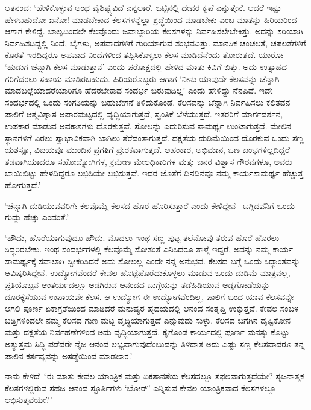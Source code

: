 ಆತನಂದ: ‘ಹೇಳಿಕೊಳ್ಳುವ ಅಂಥ ವೈಶಿಷ್ಟ್ಯವಿದೆ ಎನ್ನಲಾರೆ. ಒಟ್ಟಿನಲ್ಲಿ ದೇವರ ಕೃಪೆ ಎನ್ನುತ್ತೇನೆ. ಆದರೆ ಇಷ್ಟು ಹೇಳಬಹುದೋ ಏನೋ! ಮಾಡಬೇಕಾದ ಕೆಲಸಗಳನ್ನೆಲ್ಲಾ ಶ್ರದ್ಧೆಯಿಂದ ಮಾಡಬೇಕು ಎಂಬ ಮಾತನ್ನು ಹಿರಿಯರಿಂದ ಆಗಾಗ ಕೇಳಿದ್ದೆ. ಬಾಲ್ಯದಿಂದಲೇ ಕೆಲವೊಂದು ಜವಾಬ್ದಾರಿಯ ಕೆಲಸಗಳನ್ನು ನಿರ್ವಹಿಸಲೇಬೇಕಿತ್ತು. ಅದನ್ನು ಸರಿಯಾಗಿ ನಿರ್ವಹಿಸದಿದ್ದಲ್ಲಿ ನಿಂದೆ, ಬೈಗಳು, ಅಪವಾದಗಳಿಗೆ ಗುರಿಯಾಗುವ ಸಂಭವವಿತ್ತು. ಮಾನಸಿಕ ಚಂಚಲತೆ, ಚಪಲತೆಗಳಿಗೆ ಕೊರತೆ ಇರದಿದ್ದರೂ ಅಪವಾದ ನಿಂದೆಗಳಿಂದ ತಪ್ಪಿಸಿಕೊಳ್ಳಲು ಕೆಲಸ ಮಾಡಿದೆನೆಂದು ತೋರುತ್ತದೆ. ಯಾರೋ ‘ಹುಡುಗ ಚೆನ್ನಾಗಿ ಕೆಲಸ ಮಾಡುತ್ತಾನೆ’ ಎಂದು ಪರೋಕ್ಷದಲ್ಲಿ ಹೇಳಿದ ಮಾತು ಕಿವಿಗೆ ಬಿತ್ತು. ಅದು ಉತ್ಸಾಹದ ಗರಿಗೆದರಲು ಸಹಾಯ ಮಾಡಿರಬಹುದು. ಹಿರಿಯರೊಬ್ಬರು ಆಗಾಗ ‘ನೀನು ಯಾವುದೇ ಕೆಲಸವನ್ನು ಚೆನ್ನಾಗಿ ಮಾಡಬಲ್ಲೆಯಾದರೆ\break ಯಾರಿಗೂ ಹೆದರಬೇಕಾದ ಸಂದರ್ಭ ಬರುವುದಿಲ್ಲ’ ಎಂದು ಹೇಳಿದ್ದು ನೆನಪಿದೆ. ಇದೇ ಸಂದರ್ಭದಲ್ಲಿ ಒಂದು ಸಂಗತಿಯನ್ನು ಬಹುಬೇಗನೆ ತಿಳಿದುಕೊಂಡೆ. ಕೆಲಸವನ್ನು ಚೆನ್ನಾಗಿ ನಿರ್ವಹಿಸಲು ಕಲಿತವನ ಪಾಲಿಗೆ ಆತ್ಮವಿಶ್ವಾಸ ಅಪಾರಮಟ್ಟದಲ್ಲಿ ವೃದ್ಧಿಯಾಗುತ್ತದೆ, ಸ್ವಂತಿಕೆ ಬೆಳೆಯುತ್ತದೆ. ಇತರರಿಗೆ ಮಾರ್ಗದರ್ಶನ, ಉಪಕಾರ ಮಾಡುವ ಅವಕಾಶಗಳು ದೊರಕುತ್ತವೆ. ಸೋಲನ್ನು ಎದುರಿಸುವ ಸಾಮರ್ಥ್ಯ ಉಂಟಾಗುತ್ತದೆ. ಮೇಲಿನ ಸ್ಥಾನಗಳಿಗೆ ಏರಲು ಸ್ವಾಭಾವಿಕವಾಗಿ ಬಾಗಿಲು ತೆರೆದಂತಾಗುತ್ತದೆ. ದಕ್ಷತೆಯ ದುಡಿಮೆಯಿಂದ ದೊರಕುವ ಒಂದು ಸಣ್ಣ ಯಶಸ್ಸೂ, ವಿಜಯವೂ ಮುಂದಿನ ಪ್ರಗತಿಗೆ ಪ್ರೇರಕವಾಗುತ್ತದೆ. ಅಹಂಕಾರ, ಅಭಿಮಾನ, ಒಣ ಜಂಭಗಳಿಲ್ಲದಿದ್ದರೆ ತಡವಾಗಿಯಾದರೂ ಸಹೋದ್ಯೋಗಿಗಳ, ಕ್ರಮೇಣ ಮೇಲಧಿಕಾರಿಗಳ ಮತ್ತು ಜನರ ವಿಶ್ವಾಸ ಗೌರವಗಳೂ, ಅವರು ಬಾಯಿಬಿಟ್ಟು ಹೇಳದಿದ್ದರೂ ಲಭಿಸಿಯೇ ಲಭಿಸುತ್ತವೆ. ಇದರ ಜೊತೆಗೆ ದಿನದಿನವೂ ನಮ್ಮ ಕಾರ್ಯಸಾಮರ್ಥ್ಯ ಹೆಚ್ಚುತ್ತ ಹೋಗುತ್ತದೆ.’

‘ಚೆನ್ನಾಗಿ ದುಡಿಯುವವರಿಗೇ ಕೆಲವೊಮ್ಮೆ ಕೆಲಸದ ಹೊರೆ ಹೊರಿಸುತ್ತಾರೆ ಎಂದು ಕೇಳಿದ್ದೇನೆ –ಬಗ್ಗಿದವನಿಗೆ ಒಂದು ಗುದ್ದು ಹೆಚ್ಚು ಎಂದಂತೆ.’

‘ಹೌದು, ಹೊರೆಯಾಗುವುದೂ ಹೌದು. ಮೊದಲು ಇಂಥ ಸಣ್ಣ ಪುಟ್ಟ ತಲೆನೋವು ತರುವ ಹೊರೆ ಹೊರಲು ಸಿದ್ಧರಿರಬೇಕು. ಇಂಥ ಸಂದರ್ಭಗಳಲ್ಲಿ ಕೆಲವೊಮ್ಮೆ ಸೋತಂತೆ ಎನಿಸಿದರೂ ತಾಳ್ಮೆ ಇದ್ದರೆ, ಅದನ್ನು ನಮ್ಮ ಕಾರ್ಯ ಸಾಮರ್ಥ್ಯಕ್ಕೆ ಸವಾಲಾಗಿ ಸ್ವೀಕರಿಸಿದರೆ ಅದು ಸೋಲಲ್ಲ ಎಂದೇ ನನ್ನ ಅನುಭವ. ಕೆಲಸದ ಬಗ್ಗೆ ಒಂದು ಸಿದ್ಧಾಂತವನ್ನು ಆವಿಷ್ಕರಿಸಿದ್ದೇನೆ. ಉದ್ಯೋಗ\-ವೆಂದರೆ ಕೇವಲ ಹೊಟ್ಟೆಹೊರೆದುಕೊಳ್ಳಲು ಮಾಡುವ ಒಂದು ದುಡಿಮೆ ಮಾತ್ರವಲ್ಲ, ಪ್ರತಿಯೊಬ್ಬನ ಆಂತರ್ಯದಲ್ಲೂ ಅಡಗಿರುವ ಆನಂದದ ಬುಗ್ಗೆಯನ್ನು ತಡೆಹಿಡಿಯುವ ಅಡ್ಡಗೋಡೆಯನ್ನು ದೂರಕ್ಕೆಸೆಯುವ ಉಪಾಯವೇ ಕೆಲಸ. ಆ ಉದ್ಯೋಗ ಈ ಉದ್ಯೋಗವೆಂದಿಲ್ಲ, ಪಾಲಿಗೆ ಬಂದ ಯಾವ ಕೆಲಸವನ್ನೇ ಆಗಲಿ ಪೂರ್ಣ ಏಕಾಗ್ರತೆಯಿಂದ ಮಾಡಿದರೆ ಮನುಷ್ಯರ ಹೃದಯದಲ್ಲಿ ಆನಂದ ಸಂತೃಪ್ತಿ ಉಕ್ಕುತ್ತವೆ. ಕೇವಲ ಸಂಬಳ ಬಡ್ತಿಗಳಿಂದಲೇ ನಮ್ಮ ಕೆಲಸದ ಗುಣ ಮಟ್ಟ ವೃದ್ಧಿಯಾಗುತ್ತದೆ ಎನ್ನುವುದು ಸುಳ್ಳು. ಕೆಲಸದ ಬಗೆಗಿನ ದೃಷ್ಟಿಕೋನ ಮತ್ತು ದಕ್ಷತೆಯ ನಿರ್ವಹಣೆಗಳಿಂದ ಅದು ವೃದ್ಧಿಯಾಗುತ್ತದೆ. ಕೈಗೊಂಡ ಕಾರ್ಯದಲ್ಲಿ ಪೂರ್ಣ ಮನಸ್ಸು ಕೊಟ್ಟು ಅತ್ಯುತ್ತಮ ಸಿದ್ಧಿ ಪಡೆದರೇ ನೈಜ ಆನಂದ ಲಭ್ಯವಾಗುವುದೆಂಬುದನ್ನು ತಿಳಿದಾತ ಅದು ಎಷ್ಟು ಸಣ್ಣ ಕೆಲಸವಾದರೂ ತನ್ನ ಪಾಲಿನ ಕರ್ತವ್ಯವನ್ನು ಅಸಡ್ಡೆಯಿಂದ ಮಾಡಲಾರ.’

ನಾನು ಕೇಳಿದೆ–‘ಈ ಮಾತು ಕೇವಲ ಯಾಂತ್ರಿಕ ಮತ್ತು ಏಕತಾನತೆಯ ಕೆಲಸದಲ್ಲೂ ಸಫಲ\-ವಾಗುತ್ತದೆಯೇ? ಸೃಜನಾತ್ಮಕ ಕೆಲಸಗಳಲ್ಲಿರುವ ಸಹಜ ಆನಂದ ಸ್ಫೂರ್ತಿಗಳು ‘ಬೋರ್​’ ಎನ್ನಿಸುವ ಕೇವಲ ಯಾಂತ್ರಿಕವಾದ ಕೆಲಸಗಳಲ್ಲೂ ಲಭಿಸುತ್ತವೆಯೇ?’

